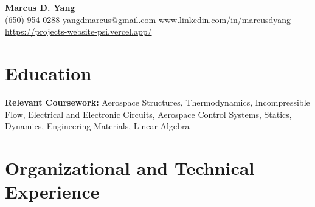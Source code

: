 \newcommand{\entrygap}{\vspace{2pt}}



\begin{center}
  {\fontsize{17}{20}\selectfont\bfseries Marcus D. Yang}\\[2pt]
  {\footnotesize (650) 954-0288 \textbar{} \href{mailto:yangdmarcus@gmail.com}{yangdmarcus@gmail.com} \textbar{} \href{https://www.linkedin.com/in/marcusdyang}{www.linkedin.com/in/marcusdyang} \textbar{} \href{https://projects-website-psi.vercel.app/}{https://projects-website-psi.vercel.app/}}
\end{center}

\section{Education}
\textbf{Relevant Coursework:} Aerospace Structures, Thermodynamics, Incompressible Flow, Electrical and Electronic Circuits, Aerospace Control Systems, Statics, Dynamics, Engineering Materials, Linear Algebra

\section{Organizational and Technical Experience}

